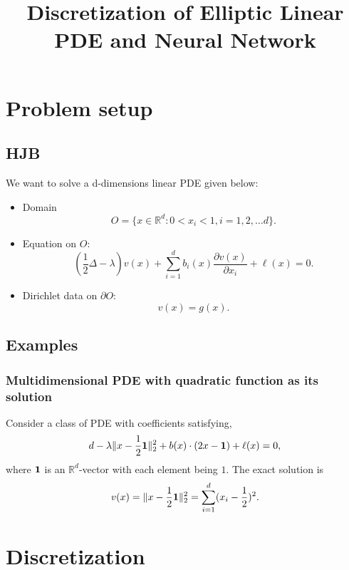 \documentclass[11pt]{amsart}
\title{Discretization of Elliptic Linear PDE and Neural Network}
\begin{document}
\maketitle

\section{Problem setup}
\subsection{HJB}
We want to solve a d-dimensions linear PDE given below:
\begin{itemize}
 \item Domain 
 $$O = \{x\in \mathbb R^{d}: 0<x_{i}< 1, i =1,2, \ldots d\}.$$
 \item Equation on $O$: 
 $$(\frac 1 2 \Delta -  \lambda) v(x) + 
 \sum_{i=1}^db_i(x)  \frac{\partial v(x)}{\partial x_i}  
  + \ell(x) = 0.$$
 \item Dirichlet data on $\partial O$:
 $$v(x) = g(x).$$
\end{itemize}

\subsection{Examples} 

\subsubsection{Multidimensional PDE with quadratic function as its solution}
Consider a class of PDE with coefficients satisfying,
$$d - \lambda \|x - \frac 1 2 {\bf 1}\|_{2}^{2} 
+ b(x)\cdot (2x - {\bf 1})+ \ell(x) = 0,$$
where ${\bf 1}$ is an $\mathbb R^{d}$-vector with each element being $1$.
The exact solution is 
$$
v(x) = \|x - \frac 1 2 {\bf 1}\|_{2}^{2} = \sum_{i=1}^{d} (x_{i} - \frac 1 2)^{2}.
$$

\section{Discretization}
\end{document}
